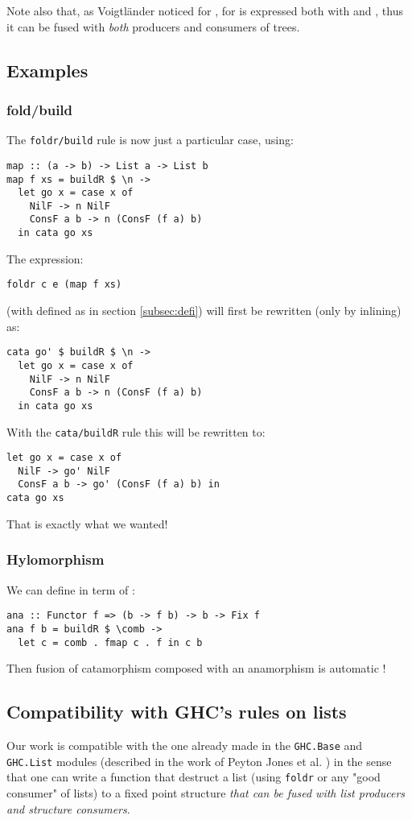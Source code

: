 Note also that, as Voigtländer \cite{Voigtlnder2008TypesFP} noticed for ,  for  is expressed both with  and , thus it can be fused with \emph{both} producers and consumers of trees.

\subsection{Examples}
\subsubsection{fold/build}
The \verb|foldr/build| rule is now just a particular case, using:
\begin{verbatim}
map :: (a -> b) -> List a -> List b
map f xs = buildR $ \n ->
  let go x = case x of
    NilF -> n NilF
    ConsF a b -> n (ConsF (f a) b)
  in cata go xs
\end{verbatim}

\noindent The expression:
\begin{verbatim}
foldr c e (map f xs)
\end{verbatim}
(with  defined as in section \ref{subsec:defi}) will first be rewritten (only by inlining) as:
\begin{verbatim}
cata go' $ buildR $ \n ->
  let go x = case x of
    NilF -> n NilF
    ConsF a b -> n (ConsF (f a) b)
  in cata go xs
\end{verbatim}

\noindent With the \verb|cata/buildR| rule this will be rewritten to:
\begin{verbatim}
let go x = case x of
  NilF -> go' NilF
  ConsF a b -> go' (ConsF (f a) b) in
cata go xs
\end{verbatim}
That is exactly what we wanted!

\subsubsection{Hylomorphism}
We can define  in term of :
\begin{verbatim}
ana :: Functor f => (b -> f b) -> b -> Fix f
ana f b = buildR $ \comb ->
  let c = comb . fmap c . f in c b
\end{verbatim}

\noindent Then fusion of catamorphism composed with an anamorphism is automatic !

\subsection{Compatibility with GHC's rules on lists}
Our work is compatible with the one already made in the \verb|GHC.Base| and \verb|GHC.List| modules (described in the work of Peyton Jones et al. \cite{playing-by-the-rules-rewriting-as-a-practical-optimisation-technique-in-ghc} ) in the sense that one can write a function that destruct a list (using \verb|foldr| or any "good consumer" of lists) to a fixed point structure \emph{that can be fused with list producers and structure consumers}.

